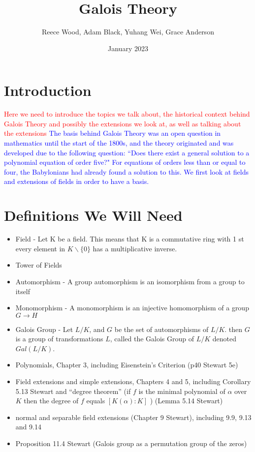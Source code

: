 \documentclass[12pt]{article}
\title{\textbf{Galois Theory}}
\author{Reece Wood, Adam Black, Yuhang Wei, Grace Anderson}
\date{January 2023}
\begin{document}
\maketitle

\tableofcontents

\newpage
\section{Introduction}
\textcolor{red}{Here we need to introduce the topics we talk about, the historical context behind Galois Theory and possibly the extensions we look at, as well as talking about the extensions}
\textcolor{blue}{The basis behind Galois Theory was an open question in mathematics until the start of the 1800s, and the theory originated and was developed due to the following question: ``Does there exist a general solution to a polynomial equation of order five?"  For equations of orders less than or equal to four, the Babylonians had already found a solution to this.
We first look at fields and extensions of fields in order to have a basis.}
\section{Definitions We Will Need}
\begin{itemize}
    \item Field - Let K be a field. This means that K is a commutative ring with 1 st every element in $K \backslash \{0\}$ has a multiplicative inverse.
    \item Tower of Fields
    \item Automorphism - A group automorphism is an isomorphism from a group to itself
    \item Monomorphism - A monomorphism is an injective homomorphism of a group $G \rightarrow{} H$
    \item Galois Group - Let $L/K$, and $G$ be the set of automorphisms of $L/K$. then $G$ is a group of transformations $L$, called the Galois Group of $L/K$ denoted $Gal(L/K)$.
    \item Polynomials, Chapter 3, including Eisenstein’s Criterion (p40 Stewart 5e)
    \item Field extensions and simple extensions, Chapters 4 and 5, including Corollary 5.13 Stewart and ``degree theorem'' (if $f$ is the minimal polynomial of $\alpha$ over $K$ then the degree of $f$ equals $[K(\alpha) : K]$ ) (Lemma 5.14 Stewart)
    \item normal and separable field extensions (Chapter 9 Stewart), including 9.9, 9.13 and 9.14
    \item Proposition 11.4 Stewart (Galois group as a permutation group of the zeros)
\end{itemize}
\end{document}
